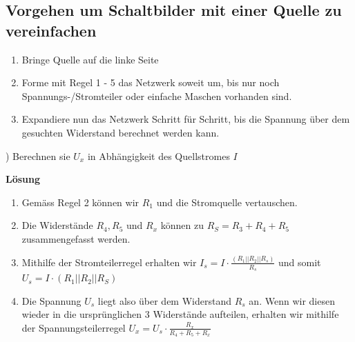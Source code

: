 										\iend




										\subsection{Vorgehen um Schaltbilder mit einer Quelle zu vereinfachen}
										\begin{enumerate}
											\item Bringe Quelle auf die linke Seite
											\item Forme mit Regel 1 - 5 das Netzwerk soweit um, bis nur noch Spannungs-/Stromteiler oder einfache Maschen vorhanden sind.
											\item Expandiere nun das Netzwerk Schritt für Schritt, bis die Spannung über dem gesuchten Widerstand berechnet werden kann.
										\end{enumerate}

										) Berechnen sie $U_x$ in Abhängigkeit des Quellstromes $I$
										\begin{center}
											\fix
										\end{center}
										\fix
										 \textbf{Lösung}
									 \begin{enumerate}
					  				 \item Gemäss Regel 2 können wir $R_1$ und die Stromquelle vertauschen.
										 \item Die Widerstände $R_4 , R_5$ und $ R_x $ können zu $ R_S = R_3 + R_4 + R_5 $ zusammengefasst werden.
										 \item Mithilfe der Stromteilerregel erhalten wir $ I_s = I \cdot \frac{(R_1 || R_2 || R_s)}{R_s} $ und somit $U_s = I \cdot (R_1 || R_2 || R_S) $
										 \item Die Spannung $U_s$ liegt also über dem Widerstand $R_s$ an. Wenn wir diesen wieder in die ursprünglichen 3 Widerstände aufteilen, erhalten wir mithilfe der Spannungsteilerregel $U_x = U_s \cdot \frac{R_x}{R_4 + R_5 + R_x} $
									 \end{enumerate}

